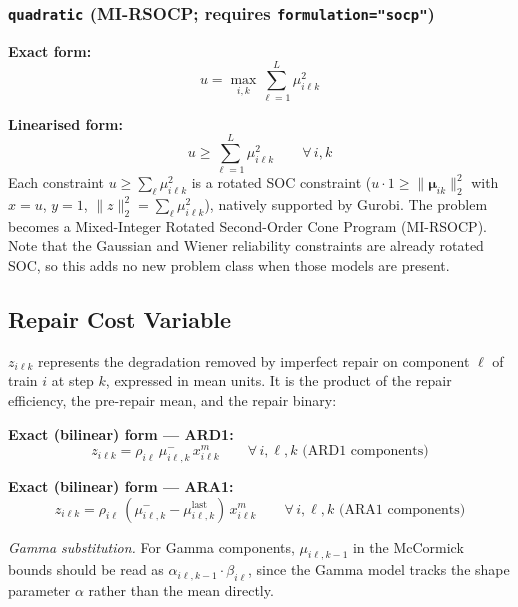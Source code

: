 \documentclass[11pt,a4paper]{article}
\begin{document}
\subsubsection{\texttt{quadratic} (MI-RSOCP; requires \texttt{formulation="socp"})}

\textbf{Exact form:}
\begin{equation}
  u = \max_{i,k} \sum_{\ell=1}^{L} \mu_{i\ell k}^2
\end{equation}

\textbf{Linearised form:}
\begin{equation}
  u \geq \sum_{\ell=1}^{L} \mu_{i\ell k}^2 \qquad \forall\, i,k
\end{equation}
Each constraint $u \geq \sum_\ell \mu_{i\ell k}^2$ is a rotated SOC constraint
($u \cdot 1 \geq \|\boldsymbol{\mu}_{ik}\|_2^2$ with $x=u$, $y=1$,
$\|z\|_2^2 = \sum_\ell \mu_{i\ell k}^2$),
natively supported by Gurobi. The problem becomes a
Mixed-Integer Rotated Second-Order Cone Program (MI-RSOCP).
Note that the Gaussian and Wiener reliability constraints are already rotated SOC,
so this adds no new problem class when those models are present.

\subsection{Repair Cost Variable}
\label{sec:repair_proxy}

$z_{i\ell k}$ represents the degradation removed by imperfect repair on component
$\ell$ of train $i$ at step $k$, expressed in mean units. It is the product of the
repair efficiency, the pre-repair mean, and the repair binary:

\textbf{Exact (bilinear) form --- ARD1:}
\begin{equation}
  z_{i\ell k} = \rho_{i\ell}\,\mu^-_{i\ell,k}\,x^m_{i\ell k}
  \qquad \forall\, i,\ell,k \text{ (ARD1 components)}
\end{equation}

\textbf{Exact (bilinear) form --- ARA1:}
\begin{equation}
  z_{i\ell k} = \rho_{i\ell}\,(\mu^-_{i\ell,k} - \mu^{\mathrm{last}}_{i\ell,k})\,x^m_{i\ell k}
  \qquad \forall\, i,\ell,k \text{ (ARA1 components)}
\end{equation}

\emph{Gamma substitution.} For Gamma components, $\mu_{i\ell,k-1}$ in the McCormick
bounds should be read as $\alpha_{i\ell,k-1} \cdot \beta_{i\ell}$, since the Gamma
model tracks the shape parameter $\alpha$ rather than the mean directly.
\end{document}
